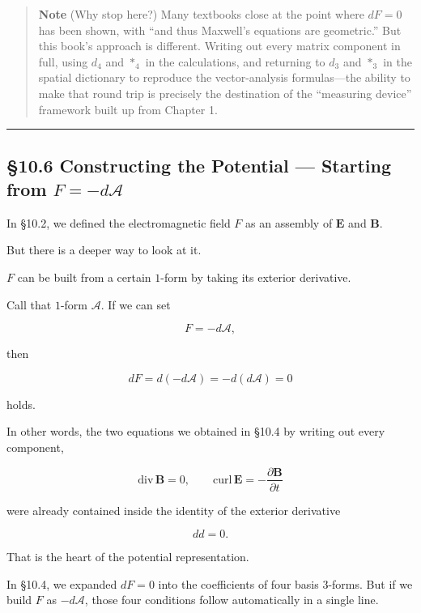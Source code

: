 \begin{quote}
\textbf{Note} (Why stop here?) Many textbooks close at the point where
\(dF=0\) has been shown, with ``and thus Maxwell's equations are
geometric.'' But this book's approach is different. Writing out every
matrix component in full, using \(d_4\) and \(\ast_4\) in the
calculations, and returning to \(d_3\) and \(\ast_3\) in the spatial
dictionary to reproduce the vector-analysis formulas---the ability to
make that round trip is precisely the destination of the ``measuring
device'' framework built up from Chapter 1.
\end{quote}

\begin{center}\rule{0.5\linewidth}{0.5pt}\end{center}

\hypertarget{constructing-the-potential-starting-from-f-dmathcala}{%
\subsection{\texorpdfstring{§10.6 Constructing the Potential ---
Starting from
\(F=-d\mathcal{A}\)}{§10.6 Constructing the Potential --- Starting from F=-d\textbackslash mathcal\{A\}}}\label{constructing-the-potential-starting-from-f-dmathcala}}

In §10.2, we defined the electromagnetic field \(F\) as an assembly of
\(\mathbf{E}\) and \(\mathbf{B}\).

But there is a deeper way to look at it.

\(F\) can be built from a certain \(1\)-form by taking its exterior
derivative.

Call that \(1\)-form \(\mathcal{A}\). If we can set

\[
F=-d\mathcal{A},
\]

then

\[
dF
=
d(-d\mathcal{A})
=
-d(d\mathcal{A})
=
0
\]

holds.

In other words, the two equations we obtained in §10.4 by writing out
every component,

\[
\mathrm{div}\,\mathbf{B}=0,
\qquad
\mathrm{curl}\,\mathbf{E}
=
-\frac{\partial\mathbf{B}}{\partial t}
\]

were already contained inside the identity of the exterior derivative

\[
dd=0.
\]

That is the heart of the potential representation.

In §10.4, we expanded \(dF=0\) into the coefficients of four basis
\(3\)-forms. But if we build \(F\) as \(-d\mathcal{A}\), those four
conditions follow automatically in a single line.

